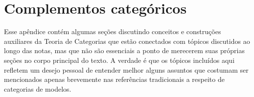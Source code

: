 \chapter{Complementos categóricos}

Esse apêndice contém algumas seções discutindo conceitos e construções auxiliares da Teoria de Categorias que estão conectados com tópicos discutidos ao longo das notas, mas que não são essenciais a ponto de merecerem suas próprias seções no corpo principal do texto.
A verdade é que os tópicos incluídos aqui refletem um desejo pessoal de entender melhor alguns assuntos que costumam ser mencionados apenas brevemente nas referências tradicionais a respeito de categorias de modelos.

